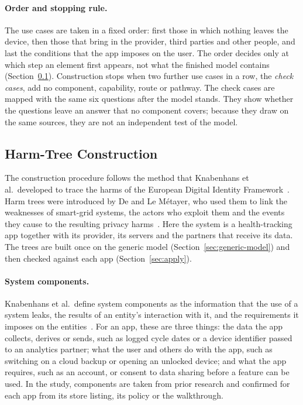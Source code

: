 \paragraph{Order and stopping rule.} The use cases are taken in a fixed order: first those in
which nothing leaves the device, then those that bring in the provider, third parties and other
people, and last the conditions that the app imposes on the user. The order decides only at
which step an element first appears, not what the finished model contains
(Section~\ref{sec:harm-trees}). Construction stops when two further use cases in a row, the
\emph{check cases}, add no component, capability, route or pathway. The check cases are mapped
with the same six questions after the model stands. They show whether the questions leave an
answer that no component covers; because they draw on the same sources, they are not an
independent test of the model.

\subsection{Harm-Tree Construction}
\label{sec:harm-trees}
The construction procedure follows the method that Knabenhans et al.\ developed to trace the
harms of the European Digital Identity Framework~\parencite[\S4.1]{knabenhans2026harms}. Harm
trees were introduced by De and Le Métayer, who used them to link the weaknesses of smart-grid
systems, the actors who exploit them and the events they cause to the resulting privacy
harms~\parencite{de2016privacy}. Here the system is a health-tracking app
together with its provider, its servers and the partners that receive its
data. The trees are built once on the generic model
(Section~\ref{sec:generic-model}) and then checked against each app
(Section~\ref{sec:apply}).

\paragraph{System components.} Knabenhans et al.\ define system components as
the information that the use of a system leaks, the results of an entity's
interaction with it, and the requirements it imposes on the
entities~\parencite[\S4.1]{knabenhans2026harms}. For an app, these are three
things: the data the app collects, derives or sends, such as logged cycle
dates or a device identifier passed to an analytics partner; what the user and
others do with the app, such as switching on a cloud backup or opening an
unlocked device; and what the app requires, such as an account, or consent to
data sharing before a feature can be used. In the study, components are taken
from prior research and confirmed for each app from its store listing, its
policy or the walkthrough.

